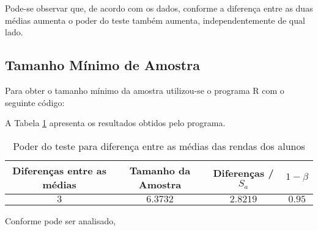 Pode-se observar que, de acordo com os dados, conforme a diferença entre as duas médias aumenta o poder do teste também aumenta, independentemente de qual lado.

\subsection{Tamanho Mínimo de Amostra}

Para obter o tamanho mínimo da amostra utilizou-se o programa R com o seguinte código:


A Tabela \ref{tb:5c} apresenta os resultados obtidos pelo programa.

\begin{table}[ht]
\centering
\caption{Poder do teste para diferença entre as médias das rendas dos alunos} 
\label{tb:5c}
\begin{tabular}{cccc}
  \toprule
  Diferenças entre as médias & Tamanho da Amostra & Diferenças / $S_a$  & $1 - \beta$ \\
  \midrule
 $3$ & $6.3732$ & $2.8219$ & $0.95$ \\ 
   \bottomrule
\end{tabular}
\end{table}

Conforme pode ser analisado, 
